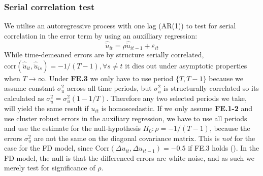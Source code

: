 \subsubsection*{Serial correlation test}
We utilise an autoregressive process with one lag (AR(1)) to test for serial correlation in the error term by using an auxilliary regression:
\begin{equation*}
    \hat{\ddot{u}}_{it}=\rho \hat{\ddot{u}}_{it-1}+\varepsilon_{it}
\end{equation*}
While time-demeaned errors are by structure serially correlated, $\text{corr}(\hat{\ddot{u}}_{it}, \hat{\ddot{u}}_{is}) = -1/(T-1), \forall s \neq t$ it dies out under asymptotic properties when $T\rightarrow \infty$. Under \textbf{FE.3} we only have to use period $\{T,T-1\}$ because we assume constant $\sigma^2 _u$ across all time periods, but $\sigma^2_{\ddot{u}}$ is structurally correlated so its calculated as $\sigma^2_{\ddot{u}}=\sigma^2_u(1-1/T)$. Therefore any two selected periods we take, will yield the same result if $u_{it}$ is homoscedastic. If we only assume \textbf{FE.1-2} and use cluster robust errors in the auxiliary regression, we have to use all periods and use the estimate for the null-hypothesis $H_0:\rho=-1/(T-1)$, because the errors $\sigma^2_{u}$ are not the same on the diagonal covariance matrix.
This is \textit{not} for the case for the FD model, since $\text{Corr}(\Delta u_{it},\Delta u_{it-1})=-0.5$ if FE.3 holds (\cite[Chapter~10.6.3]{wooldridgeEconometricAnalysisCross2010}). 
In the FD model, the null is that the differenced errors are white noise, and as such we merely test for significance of $\rho$. 


